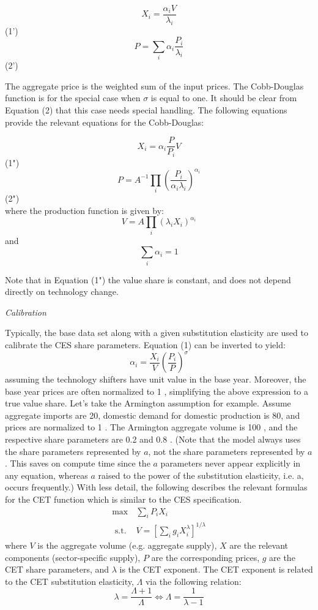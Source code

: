 \documentclass{article}
\begin{document}
$$X_{i}=\frac{\alpha_{i} V}{\lambda_{i}}$$
(1')
$$P=\sum_{i} \alpha_{i} \frac{P_{i}}{\lambda_{i}}$$
(2')

The aggregate price is the weighted sum of the input prices. The Cobb-Douglas function is for the special case when $\sigma$ is equal to one. It should be clear from Equation (2) that this case needs special handling. The following equations provide the relevant equations for the Cobb-Douglas:

$$
X_{i}=\alpha_{i} \frac{P}{P_{i}} V
$$
(1")
$$
P=A^{-1} \prod_{i}\left(\frac{P_{i}}{\alpha_{i} \lambda_{i}}\right)^{\alpha_{i}}
$$
(2")\\
where the production function is given by:
$$
V=A \prod_{i}\left(\lambda_{i} X_{i}\right)^{\alpha_{i}}
$$
and
$$
\sum_{i} \alpha_{i}=1
$$

Note that in Equation (1") the value share is constant, and does not depend directly on technology change.

\textit{Calibration}

Typically, the base data set along with a given substitution elasticity are used to calibrate the CES share parameters. Equation (1) can be inverted to yield:
$$
\alpha_{i}=\frac{X_{i}}{V}\left(\frac{P_{i}}{P}\right)^{\sigma}
$$
assuming the technology shifters have unit value in the base year. Moreover, the base year prices are often normalized to 1 , simplifying the above expression to a true value share. Let's take the Armington assumption for example. Assume aggregate imports are 20, domestic demand for domestic production is 80, and prices are normalized to 1 . The Armington aggregate volume is 100 , and the respective share parameters are 0.2 and 0.8 . (Note that the model always uses the share parameters represented by $a$, not the share parameters represented by $a$. This saves on compute time since the $a$ parameters never appear explicitly in any equation, whereas $a$ raised to the power of the substitution elasticity, i.e. a, occurs frequently.)
With less detail, the following describes the relevant formulas for the CET function which is similar to the CES specification.
$$
\begin{array}{cc}
\max & \sum_{i} P_{i} X_{i} \\
\text { s.t. } & V=\left[\sum_{i} g_{i} X_{i}^{\lambda}\right]^{1 / \lambda}
\end{array}
$$
where $V$ is the aggregate volume (e.g. aggregate supply), $X$ are the relevant components (sector-specific supply), $P$ are the corresponding prices, $g$ are the CET share parameters, and $\lambda$ is the CET exponent. The CET exponent is related to the CET substitution elasticity, $\Lambda$ via the following relation:
$$
\lambda=\frac{\Lambda+1}{\Lambda} \Leftrightarrow \Lambda=\frac{1}{\lambda-1}
$$
\end{document}
